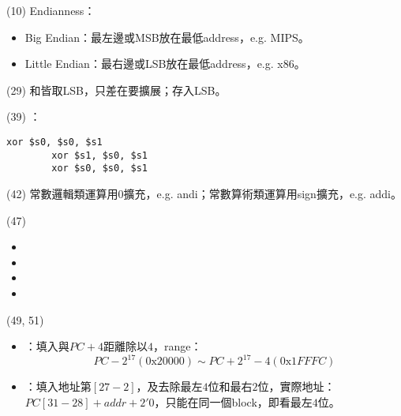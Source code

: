 \item \begin{theorem}{(10)} Endianness：\begin{itemize}
        \item Big Endian：最左邊或MSB放在最低address，e.g. MIPS。
        \item Little Endian：最右邊或LSB放在最低address，e.g. x86。
    \end{itemize}
\end{theorem}

\item \begin{theorem}{(29)} 和皆取LSB，只差在要擴展；存入LSB。
\end{theorem}

\item \begin{theorem}{(39)} ： \begin{lstlisting}[language={[x86masm]Assembler}]
        xor $s0, $s0, $s1
        xor $s1, $s0, $s1
        xor $s0, $s0, $s1
    \end{lstlisting}
\end{theorem}

\item \begin{theorem}{(42)} 常數邏輯類運算用$0$擴充，e.g. andi；常數算術類運算用sign擴充，e.g. addi。
\end{theorem}

\item \begin{theorem}{(47)} \quad\quad \begin{itemize}
        \item {}
        \item {}
        \item {}
        \item {}
    \end{itemize}
\end{theorem}

\item \begin{theorem}{(49, 51)} \quad\quad \begin{itemize}
        \item {}：填入與$PC + 4$距離除以$4$，range：\begin{equation}
            PC - 2^{17} (0\text{x}20000) \sim PC + 2^{17} - 4 (0\text{x}1FFFC)
        \end{equation}
        \item {}：填入地址第$[27 - 2]$，及去除最左$4$位和最右$2$位，實際地址：$PC[31 - 28] + addr + 2'0$，只能在同一個block，即看最左$4$位。
    \end{itemize}
\end{theorem}

